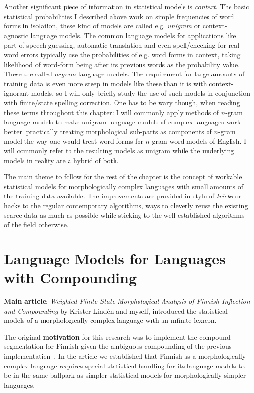 \documentclass[officiallayout]{unihelcompling}
\begin{document}
Another significant piece of information in statistical models is
\emph{context}. The basic statistical probabilities I described above work on
simple frequencies of word forms in isolation, these kind of models are called
e.g. \emph{unigram} or context-agnostic language models. The common language
models for applications like part-of-speech guessing, automatic translation and
even spell\-/checking for real word errors typically use the probabilities of
e.g.  word forms in context, taking likelihood of word-form being after its
previous words as the probability value. These are called \emph{\(n\)-gram}
language models.  The requirement for large amounts of training data is even
more steep in models like these than it is with context-ignorant models, so I
will only briefly study the use of such models in conjunction with finite\-/state
spelling correction. One has to be wary though, when reading these terms
throughout this chapter: I will commonly apply methods of \(n\)-gram language
models to make unigram language models of complex languages work better,
practically treating morphological sub-parts as components of \(n\)-gram model the
way one would treat word forms for \(n\)-gram word models of English. I will
commonly refer to the resulting models as unigram while the underlying models
in reality are a hybrid of both.

The main theme to follow for the rest of the chapter is the concept of workable
statistical models for morphologically complex languages with small amounts of
the training data available. The improvements are provided in style of
\emph{tricks} or hacks to the regular contemporary algorithms, ways to cleverly
reuse the existing scarce data as much as possible while sticking to the well
established algorithms of the field otherwise.

\section{Language Models for Languages with Compounding}
\label{sec:compounding}

\textbf{Main article}: \emph{Weighted Finite-State Morphological Analysis of
Finnish Inflection and Compounding}  by Krister
Lindén and myself, introduced the statistical models of a morphologically
complex language with an infinite lexicon.

The original \textbf{motivation} for this research was to implement the
compound segmentation for Finnish given the ambiguous compounding of the
previous implementation~\citep{pirinen2008suomen}. In the article we
established that Finnish as a morphologically complex language requires special
statistical handling for its language models to be in the same ballpark as
simpler statistical models for morphologically simpler languages.
\end{document}
